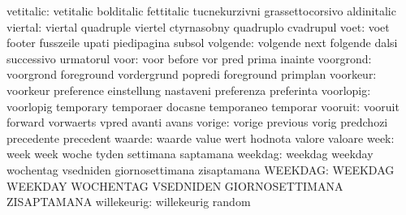                 vetitalic: vetitalic                 bolditalic
                           fettitalic                tucnekurzivni
                           grassettocorsivo          aldinitalic
                  viertal: viertal                   quadruple
                           viertel                   ctyrnasobny
                           quadruplo                 cvadrupul
                     voet: voet                      footer
                           fusszeile                 upati
                           piedipagina               subsol
                 volgende: volgende                  next
                           folgende                  dalsi
                           successivo                urmatorul
                     voor: voor                      before
                           vor                       pred
                           prima                     inainte
                voorgrond: voorgrond                 foreground
                           vordergrund               popredi
                           foreground                primplan
                 voorkeur: voorkeur                  preference
                           einstellung               nastaveni
                           preferenza                preferinta
                voorlopig: voorlopig                 temporary
                           temporaer                 docasne
                           temporaneo                temporar
                  vooruit: vooruit                   forward
                           vorwaerts                 vpred
                           avanti                    avans
                   vorige: vorige                    previous
                           vorig                     predchozi
                           precedente                precedent
                   waarde: waarde                    value
                           wert                      hodnota
                           valore                    valoare
                     week: week                      week
                           woche                     tyden
                           settimana                 saptamana
                  weekdag: weekdag                   weekday
                           wochentag                 vsedniden
                           giornosettimana           zisaptamana
                  WEEKDAG: WEEKDAG                   WEEKDAY
                           WOCHENTAG                 VSEDNIDEN
                           GIORNOSETTIMANA           ZISAPTAMANA
              willekeurig: willekeurig               random
